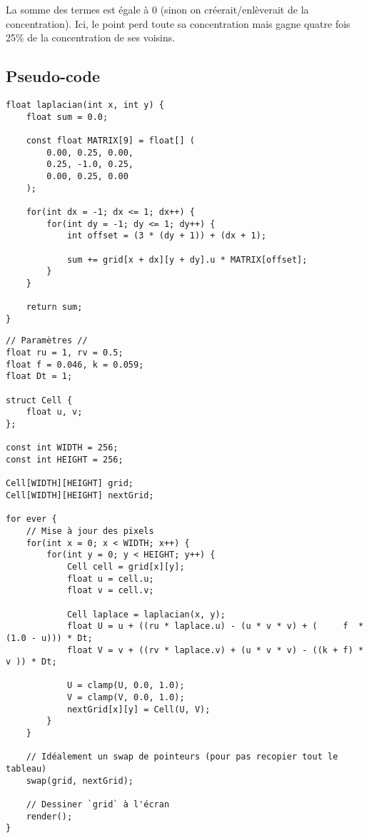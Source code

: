 \documentclass[11pt]{scrartcl}
\begin{document}
            La somme des termes est égale à $0$ (sinon on créerait/enlèverait de la concentration).
            Ici, le point perd toute sa concentration mais gagne quatre fois 25\% de la concentration de ses voisins.

        \subsection{Pseudo-code}\label{subsec:pseudo-code}

            \begin{verbatim}
float laplacian(int x, int y) {
    float sum = 0.0;

    const float MATRIX[9] = float[] (
        0.00, 0.25, 0.00,
        0.25, -1.0, 0.25,
        0.00, 0.25, 0.00
    );

    for(int dx = -1; dx <= 1; dx++) {
        for(int dy = -1; dy <= 1; dy++) {
            int offset = (3 * (dy + 1)) + (dx + 1);

            sum += grid[x + dx][y + dy].u * MATRIX[offset];
        }
    }

    return sum;
}
            \end{verbatim}

            \begin{verbatim}
// Paramètres //
float ru = 1, rv = 0.5;
float f = 0.046, k = 0.059;
float Dt = 1;

struct Cell {
    float u, v;
};

const int WIDTH = 256;
const int HEIGHT = 256;

Cell[WIDTH][HEIGHT] grid;
Cell[WIDTH][HEIGHT] nextGrid;

for ever {
    // Mise à jour des pixels
    for(int x = 0; x < WIDTH; x++) {
        for(int y = 0; y < HEIGHT; y++) {
            Cell cell = grid[x][y];
            float u = cell.u;
            float v = cell.v;

            Cell laplace = laplacian(x, y);
            float U = u + ((ru * laplace.u) - (u * v * v) + (     f  * (1.0 - u))) * Dt;
            float V = v + ((rv * laplace.v) + (u * v * v) - ((k + f) *        v )) * Dt;

            U = clamp(U, 0.0, 1.0);
            V = clamp(V, 0.0, 1.0);
            nextGrid[x][y] = Cell(U, V);
        }
    }

    // Idéalement un swap de pointeurs (pour pas recopier tout le tableau)
    swap(grid, nextGrid);

    // Dessiner `grid` à l'écran
    render();
}
            \end{verbatim}
\end{document}
